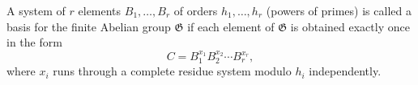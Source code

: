 A system of $r$ elements $B_1,\ldots,B_r$ of orders $h_1,\ldots,h_r$ (powers of primes) is called a basis for the finite Abelian group $\mathfrak{G}$ if each element of $\mathfrak{G}$ is obtained exactly once in the form
$$C = B_1^{x_1}B_2^{x_2}\cdots B_r^{x_r},$$
where $x_i$ runs through a complete residue system modulo $h_i$ independently.
